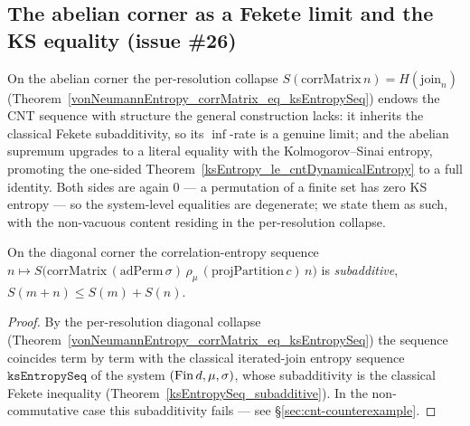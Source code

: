 \subsection{The abelian corner as a Fekete limit and the KS equality (issue \#26)}
\label{sec:cnt-abelian-full}

On the abelian corner the per-resolution collapse
\(S(\mathrm{corrMatrix}\,n) = H(\text{join}_n)\) (Theorem~\ref{vonNeumannEntropy_corrMatrix_eq_ksEntropySeq})
endows the CNT sequence with structure the general construction lacks: it inherits the classical
Fekete subadditivity, so its \(\inf\)-rate is a genuine limit; and the abelian supremum upgrades to a
literal equality with the Kolmogorov--Sinai entropy, promoting the one-sided
Theorem~\ref{ksEntropy_le_cntDynamicalEntropy} to a full identity. Both sides are again \(0\) --- a
permutation of a finite set has zero KS entropy --- so the system-level equalities are degenerate;
we state them as such, with the non-vacuous content residing in the per-resolution collapse.

\begin{theorem}\label{subadditive_vonNeumannEntropy_corrMatrix_abelian}
  \leanok
  On the diagonal corner the correlation-entropy sequence
  \(n\mapsto S\bigl(\mathrm{corrMatrix}\,(\mathrm{adPerm}\,\sigma)\,\rho_\mu\,(\mathrm{projPartition}\,c)\,n\bigr)\)
  is \emph{subadditive}, \(S(m+n)\le S(m) + S(n)\).
\end{theorem}
\begin{proof}\leanok
  By the per-resolution diagonal collapse
  (Theorem~\ref{vonNeumannEntropy_corrMatrix_eq_ksEntropySeq}) the sequence coincides term by term
  with the classical iterated-join entropy sequence \(\texttt{ksEntropySeq}\) of the system
  \((\operatorname{Fin} d,\mu,\sigma)\), whose subadditivity is the classical Fekete inequality
  (Theorem~\ref{ksEntropySeq_subadditive}). In the non-commutative case this subadditivity fails ---
  see \S\ref{sec:cnt-counterexample}.
\end{proof}


